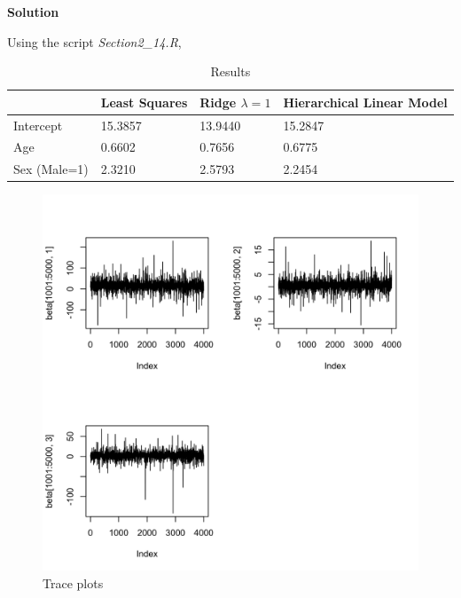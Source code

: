 \documentclass[twoside]{article}
\begin{document}
\color{blue}
\textbf{Solution}

Using the script \textit{Section2\_14.R}, 

\color{black}{
	
}

\begin{table}[H]
	\centering
	\caption{Results}
	\label{my-label}
	\begin{tabular}{|l|l|l|l|}
		\hline
		\textbf{} & \textbf{Least Squares} & \textbf{Ridge $ \lambda = 1$} & \textbf{Hierarchical Linear Model} \\ \hline
		Intercept & 15.3857                & 13.9440                     & 15.2847                        \\ \hline
		Age       & 0.6602                 & 0.7656                      & 0.6775                        \\ \hline
		Sex (Male=1)      & 2.3210                 & 2.5793                      & 2.2454                         \\ \hline
	\end{tabular}
\end{table}


\begin{figure}[H]
	\begin{center}
		\includegraphics[width=.8\linewidth]{Section2R/Figures/P2_14_Trace.png}
		\caption{Trace plots}
	\end{center}
\end{figure}

\color{black}
\end{document}
